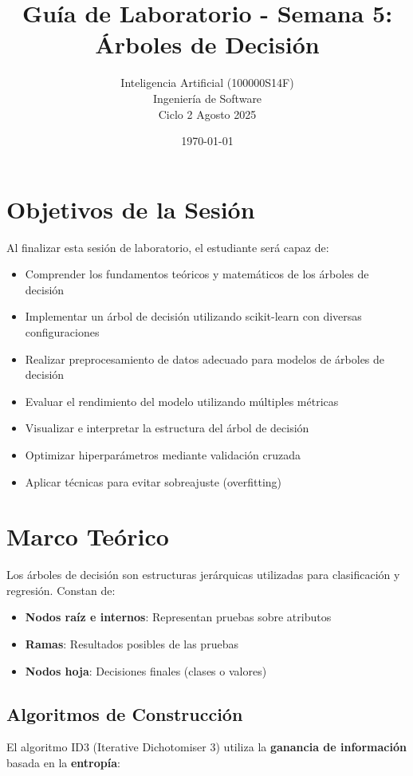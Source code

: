 \documentclass[12pt]{article}
\title{Guía de Laboratorio - Semana 5: Árboles de Decisión}
\author{Inteligencia Artificial (100000S14F) \\ Ingeniería de Software \\ Ciclo 2 Agosto 2025}
\date{\today}
\begin{document}
\maketitle

\section{Objetivos de la Sesión}
Al finalizar esta sesión de laboratorio, el estudiante será capaz de:
\begin{itemize}
    \item Comprender los fundamentos teóricos y matemáticos de los árboles de decisión
    \item Implementar un árbol de decisión utilizando scikit-learn con diversas configuraciones
    \item Realizar preprocesamiento de datos adecuado para modelos de árboles de decisión
    \item Evaluar el rendimiento del modelo utilizando múltiples métricas
    \item Visualizar e interpretar la estructura del árbol de decisión
    \item Optimizar hiperparámetros mediante validación cruzada
    \item Aplicar técnicas para evitar sobreajuste (overfitting)
\end{itemize}

\section{Marco Teórico}

Los árboles de decisión son estructuras jerárquicas utilizadas para clasificación y regresión. Constan de:

\begin{itemize}
    \item \textbf{Nodos raíz e internos}: Representan pruebas sobre atributos
    \item \textbf{Ramas}: Resultados posibles de las pruebas
    \item \textbf{Nodos hoja}: Decisiones finales (clases o valores)
\end{itemize}

\subsection{Algoritmos de Construcción}

El algoritmo ID3 (Iterative Dichotomiser 3) utiliza la \textbf{ganancia de información} basada en la \textbf{entropía}:
\end{document}

